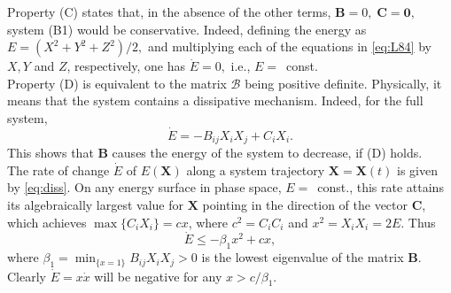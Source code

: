 \documentclass[%
 aip, cha,
 amsmath,amssymb,
 reprint,%
author-year,%
]{revtex4-1}
\newcommand{\X}{\mathbf X}
\newcommand{\0}{\mathbf 0}
\newcommand{\B}{\mathbf B}
\newcommand{\C}{\mathbf C}
\begin{document}
Property (C) states that, in the absence of the other terms, $\B = 0, \; \C = \0,$ system (B1) would be conservative. Indeed, defining the energy as $E = (X^2+ Y^2 + Z^2)/2,$ and multiplying each of the equations in \eqref{eq:L84} by $X, Y$ and $Z$, respectively, one has $\dot E = 0,$ i.e., $E =$~const. \\
Property (D) is equivalent to the matrix $\mathcal B$ being positive definite. Physically, it means that the system contains a dissipative mechanism. Indeed, for the full system, 
\begin{equation} \label{eq:diss}
	\dot E = - B_{ij} X_i X_j + C_i X_i. \tag{B3}
\end{equation}
This shows that $\B$ causes the energy of the system to decrease, if (D) holds. \\
The rate of change $\dot E$ of $E(\X)$ along a system trajectory $\X = \X(t)$ is given by \eqref{eq:diss}. On any energy surface in phase space, $E = $~const., this rate attains its algebraically largest value for $\X$ pointing in the direction of the vector $\C$, which achieves 
$\max \{C_i X_i\} = cx$, where $c^2 = C_i C_i$ and $x^2 = X_i X_i = 2E$. Thus
\begin{equation}
\dot E \le - \beta_1 x^2 + cx,   \tag{B4}
\end{equation}
where $\beta_1 = \min_{\{x=1\}} {B_{ij} X_i X_j > 0}$ is the lowest eigenvalue of the matrix $\B$. Clearly $ \dot E = x \dot x$ will be negative for any $x > c/\beta_1.$ 
\end{document}
